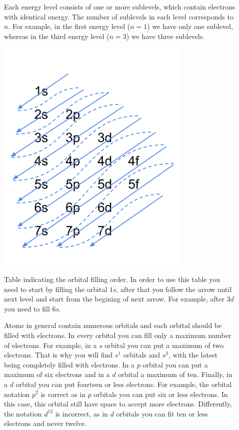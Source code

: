 \documentclass[main.tex]{subfiles}
\begin{document}
\begin{description}
\item[] 
Each energy level consists of one or more sublevels, which contain electrons with identical energy. The number of sublevels in each level corresponds to $n$. For example, in the first energy level ($n=1$) we have only one sublevel, whereas in the third energy level ($n=3$) we have three sublevels.
\begin{marginfigure}%
      \includegraphics[width=1\linewidth,scale=0.5]{chapter3/figure1-4}
      \caption{Table indicating the orbital filling order. In order to use this table you need to start by filling the orbital $1s$, after that you follow the arrow until next level and start from the begining of next arrow. For example, after $3d$ you need to fill $6s$.}
      \label{orbitalfill}
\end{marginfigure}%
\item[] 
Atoms in general contain numerous orbitals and each orbital should be filled with electrons. In every orbital you can fill only a maximum number of electrons. For example, in a $s$ orbital you can put a maximum of two electrons. That is why you will find $s^1$ orbitals and $s^2$, with the latest being completely filled with electrons. In a $p$ orbital you can put a maximum of six electrons and in a $d$ orbital a maximum of ten. Finally, in a $d$ orbital you can put fourteen or less electrons. For example, the orbital notation $p^2$ is correct as in $p$ orbitals you can put six or less electrons. In this case, this orbital still have space to accept more electrons. Differently, the notation $d^12$ is incorrect, as in $d$ orbitals you can fit ten or less electrons and never twelve.


\end{description}
\end{document}

